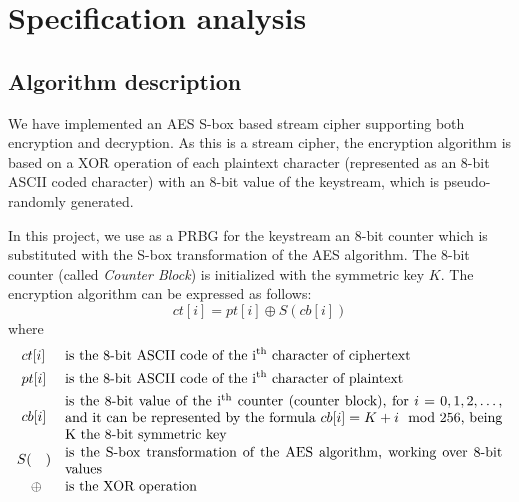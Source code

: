 \section{Specification analysis}

\subsection{Algorithm description}
We have implemented an AES S-box based stream cipher supporting both encryption and decryption. As this is a stream cipher, the encryption algorithm is based on a XOR operation of each plaintext character (represented as an 8-bit ASCII coded character) with an 8-bit value of the keystream, which is pseudo-randomly generated.

In this project, we use as a PRBG for the keystream an 8-bit counter which is substituted with the S-box transformation of the AES algorithm. The 8-bit counter (called \textit{Counter Block}) is initialized with the symmetric key $K$. The encryption algorithm can be expressed as follows:
\begin{equation}
    \label{eqn:enc}
    ct[i] = pt[i] \oplus S(cb[i])
\end{equation}
where
\begin{align*}
     & \  ct[i]     &  & \text{is the 8-bit ASCII code of the i\textsuperscript{th} character of ciphertext}                                                                                                                                \\
     & \  pt[i]     &  & \text{is the 8-bit ASCII code of the i\textsuperscript{th} character of plaintext}                                                                                                                                 \\
     & \ cb[i]      &  & \parbox{11cm}{is the 8-bit value of the i\textsuperscript{th} counter (counter block), for $i = 0,1,2, \dots$, and it can be represented by the formula $cb[i] = K + i \mod 256$, being K the 8-bit symmetric key} \\
     & S(\quad )    &  & \parbox{11cm}{is the S-box transformation of the AES algorithm, working over 8-bit values}                                                                                                                         \\
     & \ \ \ \oplus &  & \text{is the XOR operation}                                                                                                                                                                                        \\
\end{align*}

